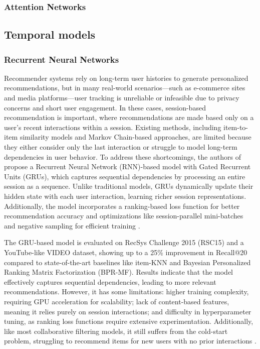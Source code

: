 \documentclass{ieeetj}
\begin{document}
\subsubsection{Attention Networks}

\subsection{Temporal models}
\subsubsection{Recurrent Neural Networks}
Recommender systems rely on long-term user histories to generate personalized recommendations, but in many real-world scenarios—such as e-commerce sites and media platforms—user tracking is unreliable or infeasible due to privacy concerns and short user engagement. In these cases, session-based recommendation is important, where recommendations are made based only on a user's recent interactions within a session. Existing methods, including item-to-item similarity models and Markov Chain-based approaches, are limited because they either consider only the last interaction or struggle to model long-term dependencies in user behavior. To address these shortcomings, the authors of \cite{hidasi2015session} propose a Recurrent Neural Network (RNN)-based model with Gated Recurrent Units (GRUs), which captures sequential dependencies by processing an entire session as a sequence. Unlike traditional models, GRUs dynamically update their hidden state with each user interaction, learning richer session representations. Additionally, the model incorporates a ranking-based loss function for better recommendation accuracy and optimizations like session-parallel mini-batches and negative sampling for efficient training \cite{hidasi2015session}.

The GRU-based model is evaluated on RecSys Challenge 2015 (RSC15) and a YouTube-like VIDEO dataset, showing up to a 25\% improvement in Recall@20 compared to state-of-the-art baselines like item-KNN and Bayesian Personalized Ranking Matrix Factorization (BPR-MF). Results indicate that the model effectively captures sequential dependencies, leading to more relevant recommendations. However, it has some limitations: higher training complexity, requiring GPU acceleration for scalability; lack of content-based features, meaning it relies purely on session interactions; and difficulty in hyperparameter tuning, as ranking loss functions require extensive experimentation. Additionally, like most collaborative filtering models, it still suffers from the cold-start problem, struggling to recommend items for new users with no prior interactions \cite{hidasi2015session}.
\end{document}
